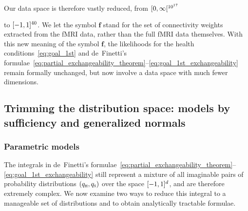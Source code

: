 \documentclass[%
]{frontiersSCNS-nologo} %
\renewcommand*{\|}{\mathpunct{|}}%
\DeclarePairedDelimiter\clcl{[}{]}
\DeclarePairedDelimiter\clop{[}{[}
\newcommand*{\yhu}{\textsc{h}}
\newcommand*{\yhd}{\textsc{s}}
\newcommand*{\yf}{\bm{f}}
\newcommand*{\yxx}{f}
\newcommand*{\yx}{\bm{\yxx}}
\newcommand*{\yph}{q_{\yhu}}
\newcommand*{\yps}{q_{\yhd}}
\newcommand*{\yd}{d}
\begin{document}
Our data space is therefore vastly reduced, from  $\clop{0,\infty}^{10^{17}}$

to $\clcl{-1,1}^{40}$. We let the symbol $\yf$ stand for the set of
connectivity weights extracted from the fMRI data, rather than the full
fMRI data themselves. With this new meaning of the symbol $\yx$, the
likelihoods for the health conditions~\eqref{eq:goal_1st} and de~Finetti's
formulae~\eqref{eq:partial_exchangeability_theorem}--\eqref{eq:goal_1st_exchangeability}
remain formally unchanged, but now involve a data space with much fewer
dimensions.

\subsection{Trimming the distribution space: models by sufficiency and
  generalized normals}
\label{sec:sufficiency}

\subsubsection{Parametric models}
\label{sec:parametric_models}

The integrals in de~Finetti's
formulae~\eqref{eq:partial_exchangeability_theorem}--\eqref{eq:goal_1st_exchangeability}
still represent a mixture of all imaginable pairs of probability
distributions $(\yph, \yps)$ over the space $\clcl{-1,1}^{\yd}$, and are
therefore extremely complex. We now examine two ways to reduce this
integral to a manageable set of distributions and to obtain analytically
tractable formulae.
\end{document}
